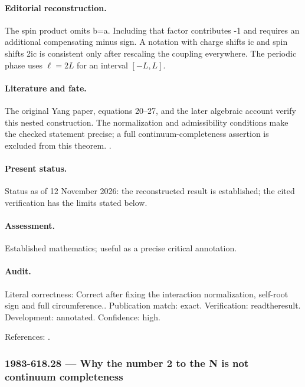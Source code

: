 \paragraph{Editorial reconstruction.} The spin product omits b=a. Including that factor contributes -1 and requires an additional compensating minus sign. A notation with charge shifts ic and spin shifts 2ic is consistent only after rescaling the coupling everywhere. The periodic phase uses $\ell=2L$ for an interval $[-L,L]$.

\paragraph{Literature and fate.} The original Yang paper, equations 20--27, and the later algebraic account verify this nested construction. The normalization and admissibility conditions make the checked statement precise; a full continuum-completeness assertion is excluded from this theorem. \citep{yang1967manybody,faddeev1996bethe}.

\paragraph{Present status.} Status as of 12 November 2026: the reconstructed result is established; the cited verification has the limits stated below.

\paragraph{Assessment.} Established mathematics; useful as a precise critical annotation.

\paragraph{Audit.} Literal correctness: Correct after fixing the interaction normalization, self-root sign and full circumference.. Publication match: exact. Verification: readtheresult. Development: annotated. Confidence: high.

\noindent References: \citep{yang1967manybody,faddeev1996bethe}.\par

\subsubsection{1983-618.28 --- Why the number 2 to the N is not continuum completeness}

\label{item:1983-618.28}

